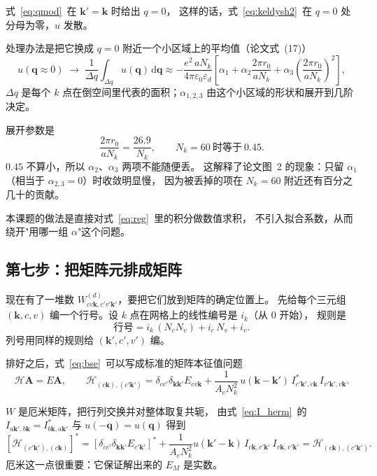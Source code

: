 \documentclass[11pt,a4paper]{ctexart}
\newcommand{\kk}{\mathbf{k}}
\newcommand{\kq}{\mathbf{k}'}
\newcommand{\qq}{\mathbf{q}}
\newcommand{\eps}{\varepsilon}
\newcommand{\dd}{\mathrm{d}}
\begin{document}
式~\eqref{eq:qmod}~在 $\kq=\kk$ 时给出 $q=0$，
这样的话，式~\eqref{eq:keldysh2}~在 $q=0$ 处分母为零，$u$ 发散。

处理办法是把它换成 $q=0$ 附近一个小区域上的平均值（论文式~(17)）
\begin{equation}
u(\qq\approx0)\;\longrightarrow\;\frac{1}{\Delta q}\int_{\Delta q}u(\qq)\,\dd\qq
\approx-\frac{e^2\,aN_k}{4\pi\eps_0\eps_d}\left[\alpha_1+\alpha_2\frac{2\pi r_0}{aN_k}
+\alpha_3\left(\frac{2\pi r_0}{aN_k}\right)^2\right],
\label{eq:reg}
\end{equation}
$\Delta q$ 是每个 $k$ 点在倒空间里代表的面积；$\alpha_{1,2,3}$ 
由这个小区域的形状和展开到几阶决定。

展开参数是
\begin{equation*}
\frac{2\pi r_0}{aN_k}=\frac{26.9}{N_k},\qquad N_k=60\ \text{时等于}\ 0.45 .
\end{equation*}
$0.45$ 不算小，所以 $\alpha_2$、$\alpha_3$ 两项不能随便丢。
这解释了论文图~2 的现象：只留 $\alpha_1$（相当于 $\alpha_{2,3}=0$）时收敛明显慢，
因为被丢掉的项在 $N_k=60$ 附近还有百分之几十的贡献。

本课题的做法是直接对式~\eqref{eq:reg}~里的积分做数值求积，
不引入拟合系数，从而绕开"用哪一组 $\alpha$"这个问题。

\subsection{第七步：把矩阵元排成矩阵}

现在有了一堆数 $W^{(d)}_{cv\kk,c'v'\kq}$，要把它们放到矩阵的确定位置上。
先给每个三元组 $(\kk,c,v)$ 编一个行号。设 $k$ 点在网格上的线性编号是 $i_k$（从 0 开始），
规则是
\begin{equation}
\text{行号}=i_k\,(N_cN_v)+i_c\,N_v+i_v .
\label{eq:index}
\end{equation}
列号用同样的规则给 $(\kq,c',v')$ 编。

排好之后，式~\eqref{eq:bse}~可以写成标准的矩阵本征值问题
\begin{equation}
\mathcal{H}\mathbf A=E\mathbf A,
\qquad
\mathcal{H}_{(c\kk),(c'\kq)}
=\delta_{cc'}\delta_{\kk\kq}E_{cv\kk}
+\frac{1}{A_cN_k^2}\,u(\kk-\kq)\,I^{*}_{c'\kq,c\kk}\,I_{v'\kq,v\kk}.
\label{eq:bse_matrix}
\end{equation}

$W$ 是厄米矩阵，把行列交换并对整体取复共轭，
由式~\eqref{eq:I_herm}~的 $I_{a\kq,b\kk}=I^{*}_{b\kk,a\kq}$ 与 $u(-\qq)=u(\qq)$ 得到
\begin{equation*}
\left[\mathcal{H}_{(c'\kq),(c\kk)}\right]^{*}
=\left[\delta_{cc'}\delta_{\kk\kq}E_{c'\kq}\right]^{*}
+\frac{1}{A_cN_k^2}u(\kq-\kk)\,I_{c\kk,c'\kq}\,I_{v\kk,v'\kq}
=\mathcal{H}_{(c\kk),(c'\kq)} .
\end{equation*}
厄米这一点很重要：它保证解出来的 $E_M$ 是实数。
\end{document}
